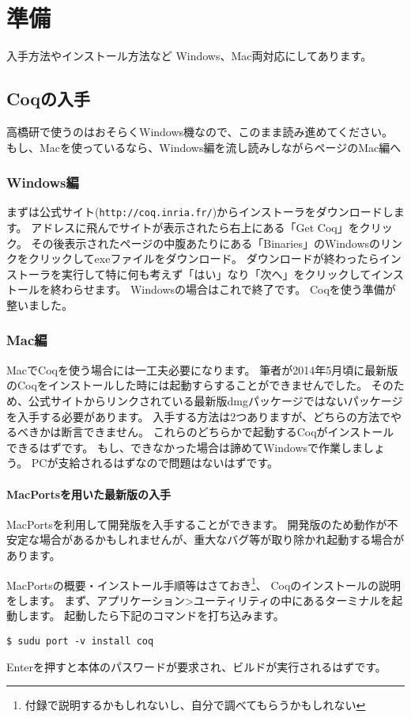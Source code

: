 \documentclass{jsbook}
\begin{document}
\chapter{準備\label{準備}}
入手方法やインストール方法など
Windows、Mac両対応にしてあります。
\newpage
\section{Coqの入手}

高橋研で使うのはおそらくWindows機なので、このまま読み進めてください。
もし、Macを使っているなら、Windows編を流し読みしながら\pageref{Mac編}ページのMac編へ
\subsection*{Windows編}
まずは公式サイト(\verb|http://coq.inria.fr/|)からインストーラをダウンロードします。
アドレスに飛んでサイトが表示されたら右上にある「Get Coq」をクリック。
その後表示されたページの中腹あたりにある「Binaries」のWindowsのリンクをクリックしてexeファイルをダウンロード。
ダウンロードが終わったらインストーラを実行して特に何も考えず「はい」なり「次へ」をクリックしてインストールを終わらせます。
Windowsの場合はこれで終了です。
Coqを使う準備が整いました。
\subsection*{Mac編\label{Mac編}}
MacでCoqを使う場合には一工夫必要になります。
筆者が2014年5月頃に最新版のCoqをインストールした時には起動すらすることができませんでした。
そのため、公式サイトからリンクされている最新版dmgパッケージではないパッケージを入手する必要があります。
入手する方法は2つありますが、どちらの方法でやるべきかは断言できません。
これらのどちらかで起動するCoqがインストールできるはずです。
もし、できなかった場合は諦めてWindowsで作業しましょう。
PCが支給されるはずなので問題はないはずです。

\subsubsection*{MacPortsを用いた最新版の入手}
MacPortsを利用して開発版を入手することができます。
開発版のため動作が不安定な場合があるかもしれませんが、重大なバグ等が取り除かれ起動する場合があります。

MacPortsの概要・インストール手順等はさておき\footnote{付録で説明するかもしれないし、自分で調べてもらうかもしれない}、
Coqのインストールの説明をします。
まず、アプリケーション>ユーティリティの中にあるターミナルを起動します。
起動したら下記のコマンドを打ち込みます。
\begin{verbatim}
$ sudu port -v install coq
\end{verbatim}
Enterを押すと本体のパスワードが要求され、ビルドが実行されるはずです。
\end{document}
